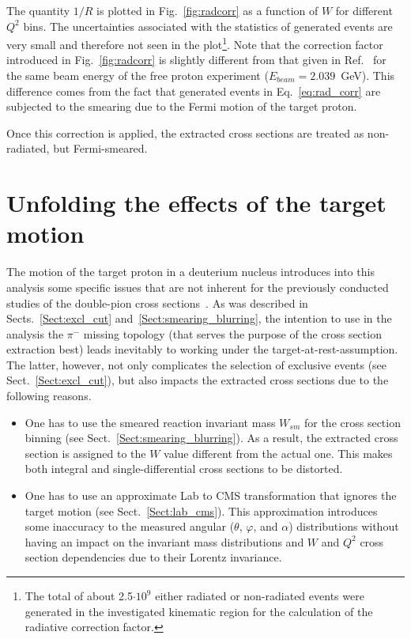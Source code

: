 The quantity $1/R$ is plotted in Fig.~\ref{fig:radcorr} as a function of $W$ for different $Q^{2}$ bins. The uncertainties associated with the statistics of generated events are very small and therefore not seen in the plot\footnote[3]{The total of about 2.5$\cdot 10^{9}$ either radiated or non-radiated events were generated in the investigated kinematic region for the calculation of the radiative correction factor.}. Note that the correction factor introduced in Fig.~\ref{fig:radcorr} is slightly different from that given in Ref.~\cite{Fed_an_note:2017} for the same beam energy of the free proton experiment ($E_{beam} = 2.039$~GeV). This difference comes from the fact that generated events in Eq.~\eqref{eq:rad_corr} are subjected to the smearing due to the Fermi motion of the target proton. 

Once this correction is applied, the extracted cross sections are treated as non-radiated, but Fermi-smeared.


\section{Unfolding the effects of the target motion}
\label{Sect:fermi_corr}


The motion of the target proton in a deuterium nucleus introduces into this analysis some specific issues that are not inherent for the previously conducted studies of the double-pion cross sections~\cite{Rip_an_note:2002,Ripani:2002ss,Fed_an_note:2007,Fedotov:2008aa,Isupov:2017lnd,Arjun,Fed_an_note:2017,Fed_paper_2018}. As was described in Sects.~\ref{Sect:excl_cut} and~\ref{Sect:smearing_blurring}, the intention to use in the analysis the $\pi^{-}$ missing topology (that serves the purpose of the cross section extraction best) leads inevitably to working under the target-at-rest-assumption. The latter, however, not only complicates the selection of exclusive events (see Sect.~\ref{Sect:excl_cut}), but also impacts the extracted cross sections due to the following reasons.


\begin{itemize}

\item  One has to use the smeared reaction invariant mass $W_{sm}$ for the cross section binning (see Sect.~\ref{Sect:smearing_blurring}). As a result, the extracted cross section is assigned to the $W$ value different from the actual one. This makes both integral and single-differential cross sections to be distorted. 

 
\item  One has to use an approximate Lab to CMS transformation that ignores the target motion (see Sect.~\ref{Sect:lab_cms}). This approximation introduces some inaccuracy to the measured angular ($\theta$, $\varphi$, and $\alpha$) distributions without having an impact on the invariant mass distributions and $W$ and $Q^{2}$ cross section dependencies due to their Lorentz invariance. 

 
\end{itemize}

